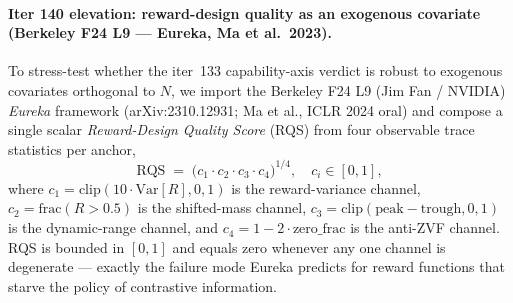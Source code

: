 \paragraph{Iter 140 elevation: reward-design quality as an exogenous
covariate (Berkeley F24 L9 --- Eureka, Ma et al.\ 2023).}
\label{par:scaling-iter140-eureka}

To stress-test whether the iter~133 capability-axis verdict is robust
to exogenous covariates orthogonal to $N$, we import the
Berkeley F24 L9 (Jim Fan / NVIDIA) \emph{Eureka} framework
(arXiv:2310.12931; Ma et al., ICLR 2024 oral) and compose a single
scalar \emph{Reward-Design Quality Score} (RQS) from four observable
trace statistics per anchor,
\begin{equation}
  \label{eq:iter140-rqs}
  \mathrm{RQS} \;=\;
  \bigl(c_1 \cdot c_2 \cdot c_3 \cdot c_4\bigr)^{1/4},
  \quad c_i \in [0, 1],
\end{equation}
where $c_1 = \mathrm{clip}(10 \cdot \mathrm{Var}[R], 0, 1)$ is the
reward-variance channel, $c_2 = \mathrm{frac}(R > 0.5)$ is the
shifted-mass channel, $c_3 = \mathrm{clip}(\mathrm{peak} - \mathrm{trough}, 0, 1)$
is the dynamic-range channel, and $c_4 = 1 - 2 \cdot \mathrm{zero\_frac}$
is the anti-ZVF channel.  RQS is bounded in $[0, 1]$ and equals
zero whenever any one channel is degenerate --- exactly the failure
mode Eureka predicts for reward functions that starve the policy of
contrastive information.

